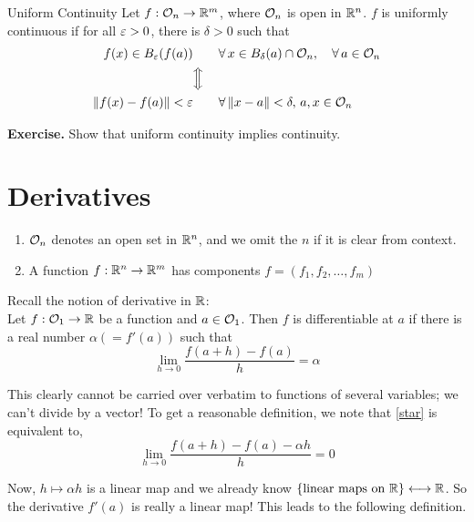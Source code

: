 \documentclass[../Analysis-3]{subfiles}
\begin{document}
\begin{Def}{Uniform Continuity}{}
  Let $ f : \mathcal{O}_{n} \to \mathbb{R}^m $, where $ \mathcal{O}_{n} $ is open in $ \mathbb{R}^n $. $ f $ is uniformly continuous if for all $ \varepsilon > 0 $, there is $ \delta > 0 $ such that
  \begin{alignat*}{2}
    f(x) \in B_\varepsilon(f(a))     & \quad            &  & \forall \, x \in B_\delta(a) \cap  \mathcal{O}_{n}, \quad \forall \, a \in \mathcal{O}_{n} \\
                               & \Big\Updownarrow                                                                               \\
    \norm{f(x) - f(a)} < \varepsilon & \quad            &  & \forall \, \norm{x - a} < \delta, \, a,x \in \mathcal{O}_{n}
  \end{alignat*}
\end{Def}

\textbf{Exercise.} Show that uniform continuity implies continuity.

\section{Derivatives}

\begin{notnBox}{}{}
  \begin{enumerate}[label = (\arabic*)]
    \item $ \mathcal{O}_{n} $ denotes an open set in $ \mathbb{R}^n $, and we omit the $ n $ if it is clear from context.
    \item A function $ f:\mathbb{R}^n \to \mathbb{R}^m $ has components $ f = (f_1, f_2, \dots, f_m) $
  \end{enumerate}
\end{notnBox}
\ssk

Recall the notion of derivative in $ \mathbb{R} $: \\
Let $ f : \mathcal{O}_{1} \to \mathbb{R} $ be a function and $ a \in \mathcal{O}_{1} $. Then $ f $ is differentiable at $ a $ if there is a real number $ \alpha (= f'(a)) $ such that
\[ \lim_{h \to 0}\frac{f(a+h)-f(a)}{h} = \alpha \label{star}\tag{1} \]

This clearly cannot be carried over verbatim to functions of several variables; we can't divide by a vector! To get a reasonable definition, we note that \eqref{star} is equivalent to,
\[ \lim_{h \to 0}\frac{f(a+h)-f(a)-\alpha h}{h} = 0 \]

Now, $ h \mapsto \alpha h $ is a linear map and we already know $ \{\text{linear maps on } \mathbb{R}\} \longleftrightarrow \mathbb{R} $. So the derivative $ f'(a) $ is really a linear map! This leads to the following definition.
\end{document}
